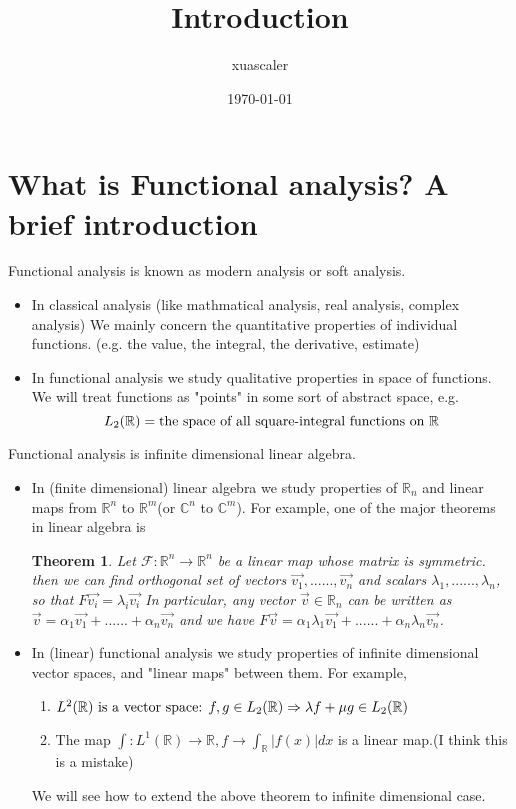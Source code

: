 \documentclass{article}
\title{Introduction}
\author{xuascaler}
\date{\today}
\newtheorem*{theorem}{Theorem}
\begin{document}
\maketitle

\section*{What is Functional analysis? A brief introduction}
Functional analysis is known as modern analysis or soft analysis.
\begin{itemize}
    \item In classical analysis (like mathmatical analysis, real analysis, complex analysis)
    We mainly concern the quantitative properties of individual functions.
    (e.g. the value, the integral, the derivative, estimate)
    \item In functional analysis we study qualitative properties in space of functions.
    We will treat functions as "points" in some sort of abstract space, e.g.
    \[
        L_2(\mathbb{R}) = \textnormal{the space of all square-integral functions on } \mathbb{R}
    \]
\end{itemize}
Functional analysis is infinite dimensional linear algebra.
\begin{itemize}
    \item In (finite dimensional) linear algebra we study properties of $\mathbb{R}_n$ and 
    linear maps from $\mathbb{R}^n$ to $\mathbb{R}^m$(or $\mathbb{C}^n$ to $\mathbb{C}^m$).
    For example, one of the major theorems in linear algebra is
    \begin{theorem}
        Let $\mathcal{F}:\mathbb{R}^n \rightarrow \mathbb{R}^n$ be a linear map whose matrix is symmetric.
        then we can find orthogonal set of vectors $\overrightarrow{v_{1}}, ......, \overrightarrow{v_{n}}$
        and scalars $\lambda_1,......,\lambda_n$, so that $F\overrightarrow{v_i}=\lambda_{i}\overrightarrow{v_{i}}$
        In particular, any vector $\overrightarrow{v} \in \mathbb{R}_{n}$ can be written as
        $\overrightarrow{v} = \alpha_1\overrightarrow{v_1} + ...... + \alpha_n\overrightarrow{v_n}$
        and we have 
        $F\overrightarrow{v} = \alpha_1\lambda_1\overrightarrow{v_1} +......+\alpha_n\lambda_n\overrightarrow{v_n}$.
    \end{theorem}
    \item In (linear) functional analysis we study properties of infinite dimensional vector spaces,
    and "linear maps" between them. For example,
    \begin{enumerate}
        \item $L^2(\mathbb{R}) \textnormal{ is a vector space: } f, g \in L_2(\mathbb{R}) \Rightarrow \lambda f + \mu g \in L_2(\mathbb{R})$
        \item The map $\int : L^1(\mathbb{R}) \rightarrow \mathbb{R}, f \rightarrow \int_{\mathbb{R}}{|f(x)|}dx$ is a linear map.(I think this is a mistake)
    \end{enumerate}
    We will see how to extend the above theorem to infinite dimensional case.
\end{itemize}
\end{document}
